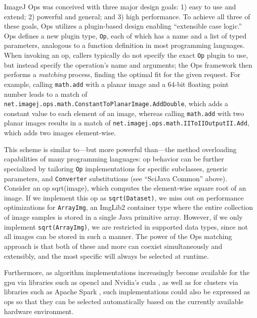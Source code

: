 \documentclass{bmcart}
\begin{document}
ImageJ Ops was conceived with three major design goals: 1) easy to use and
extend; 2) powerful and general; and 3) high performance. To achieve all three
of these goals, Ops utilizes a plugin-based design enabling ``extensible case
logic.'' Ops defines a new plugin type, \texttt{Op}, each of which has a name
and a list of typed parameters, analogous to a function definition in most
programming languages. When invoking an op, callers typically do not specify
the exact \texttt{Op} plugin to use, but instead specify the operation's name
and arguments; the Ops framework then performs a \textit{matching} process,
finding the optimal fit for the given request. For example, calling
\texttt{math.add} with a planar image and a 64-bit floating point number leads
to a match of \texttt{net.imagej.ops.math.ConstantToPlanarImage.AddDouble},
which adds a constant value to each element of an image, whereas calling
\texttt{math.add} with two planar images results in a match of
\texttt{net.imagej.ops.math.IIToIIOutputII.Add}, which adds two images
element-wise.

This scheme is similar to---but more powerful than---the method
overloading capabilities of many programming languages: op behavior can be
further specialized by tailoring \texttt{Op} implementations for specific
subclasses, generic parameters, and \texttt{Converter} substitutions (see
``SciJava Common'' above). Consider an op sqrt(image), which computes the
element-wise square root of an image. If we implement this op as
\texttt{sqrt(Dataset)}, we miss out on performance optimizations for
\texttt{ArrayImg}, an ImgLib2 container type where the entire collection of
image samples is stored in a single Java primitive array. However, if we only
implement \texttt{sqrt(ArrayImg)}, we are restricted in supported data types,
since not all images can be stored in such a manner. The power of the Ops
matching approach is that both of these and more can coexist simultaneously and
extensibly, and the most specific will always be selected at runtime.

Furthermore, as algorithm implementations increasingly become available for the
\acrshort{gpu} via libraries such as \acrfull{opencl} \cite{opencl} and
Nvidia's \acrfull{cuda} \cite{cuda}, as well as for clusters via libraries such
as Apache Spark \cite{apache_spark}, such implementations could also be
expressed as ops so that they can be selected automatically based on the
currently available hardware environment.
\end{document}
